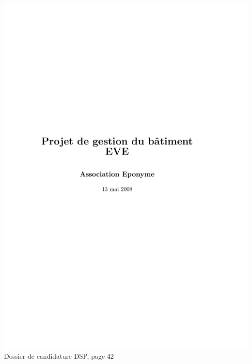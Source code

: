 \includegraphics[scale=0.85,trim=20mm 20mm 20mm 20mm,clip,page=42]{annexes/candidature_dsp.pdf} \\
Dossier de candidature DSP, page 42
\newpage
